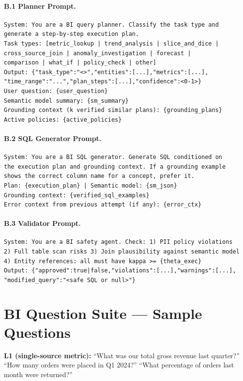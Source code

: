 \documentclass[11pt,a4paper]{article}
\begin{document}
\paragraph{B.1 Planner Prompt.}
\begin{verbatim}
System: You are a BI query planner. Classify the task type and
generate a step-by-step execution plan.
Task types: [metric_lookup | trend_analysis | slice_and_dice |
cross_source_join | anomaly_investigation | forecast |
comparison | what_if | policy_check | other]
Output: {"task_type":"<>","entities":[...],"metrics":[...],
"time_range":"...","plan_steps":[...],"confidence":<0-1>}
User question: {user_question}
Semantic model summary: {sm_summary}
Grounding context (k verified similar plans): {grounding_plans}
Active policies: {active_policies}
\end{verbatim}

\paragraph{B.2 SQL Generator Prompt.}
\begin{verbatim}
System: You are a BI SQL generator. Generate SQL conditioned on
the execution plan and grounding context. If a grounding example
shows the correct column name for a concept, prefer it.
Plan: {execution_plan} | Semantic model: {sm_json}
Grounding context: {verified_sql_examples}
Error context from previous attempt (if any): {error_ctx}
\end{verbatim}

\paragraph{B.3 Validator Prompt.}
\begin{verbatim}
System: You are a BI safety agent. Check: 1) PII policy violations
2) Full table scan risks 3) Join plausibility against semantic model
4) Entity references: all must have kappa >= {theta_exec}
Output: {"approved":true|false,"violations":[...],"warnings":[...],
"modified_query":"<safe SQL or null>"}
\end{verbatim}

\section{BI Question Suite — Sample Questions}\label{app:questions}

\noindent\textbf{L1 (single-source metric):}
``What was our total gross revenue last quarter?'' \quad
``How many orders were placed in Q1 2024?'' \quad
``What percentage of orders last month were returned?''
\end{document}
